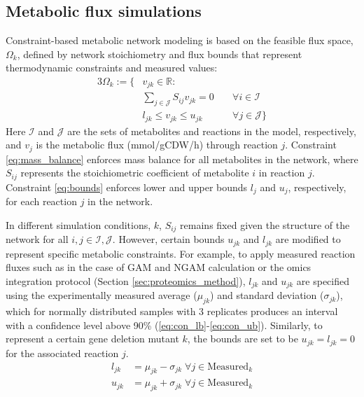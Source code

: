 \subsection{Metabolic flux simulations} \label{sec:flux_simulations}
Constraint-based metabolic network modeling\citep{palsson2015} is based on the feasible flux space, $\Omega_k$, defined by network stoichiometry and flux bounds that represent thermodynamic constraints and measured values:
\begin{alignat}{3}
    \nonumber \Omega_k := \{& v_{jk} \in \mathbb{R}:\\
    & \sum_{j \in \mathcal{J}} S_{ij} v_{jk} = 0 \; && \forall i \in  \mathcal{I} \label{eq:mass_balance}\\
    & l_{jk} \le v_{jk} \le u_{jk} \; && \forall j \in  \mathcal{J} \} \label{eq:bounds}
\end{alignat}
Here $\mathcal{I}$ and $\mathcal{J}$ are the sets of metabolites and reactions in the model, respectively, and $v_j$ is the metabolic flux (mmol/gCDW/h) through reaction $j$. Constraint \eqref{eq:mass_balance} enforces mass balance for all metabolites in the network, where $S_{ij}$ represents the stoichiometric coefficient of metabolite $i$ in reaction $j$. Constraint \eqref{eq:bounds} enforces lower and upper bounds $l_j$ and $u_j$, respectively, for each reaction $j$ in the network.

In different simulation conditions, $k$, $S_{ij}$ remains fixed  given the structure of the network for all $i,j\in\mathcal{I},\mathcal{J}$. However, certain bounds $u_{jk}$ and $l_{jk}$ are modified to represent specific metabolic constraints. For example, to apply measured reaction fluxes such as in the case of GAM and NGAM calculation or the omics integration protocol (Section \ref{sec:proteomics_method}), $l_{jk}$ and $u_{jk}$ are specified using the experimentally measured average ($\mu_{jk}$) and standard deviation ($\sigma_{jk}$), which for normally distributed samples with 3 replicates produces an interval with a confidence level above 90\% (\ref{eq:con_lb}-\ref{eq:con_ub}). %
Similarly, to represent a certain gene deletion mutant $k$, the bounds are set to be $u_{jk}=l_{jk}=0$ for the associated reaction $j$.
\begin{align}
    l_{jk} &= \mu_{jk} - \sigma_{jk} \;\forall j \in  \text{Measured}_k \label{eq:con_lb}\\
    u_{jk} &= \mu_{jk} + \sigma_{jk} \; \forall j \in  \text{Measured}_k \label{eq:con_ub}
\end{align}

